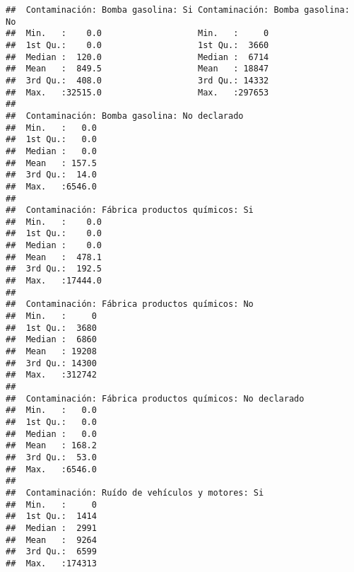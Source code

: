 \documentclass[11pt,]{article}
\begin{document}
\begin{verbatim}
##  Contaminación: Bomba gasolina: Si Contaminación: Bomba gasolina: No
##  Min.   :    0.0                   Min.   :     0                   
##  1st Qu.:    0.0                   1st Qu.:  3660                   
##  Median :  120.0                   Median :  6714                   
##  Mean   :  849.5                   Mean   : 18847                   
##  3rd Qu.:  408.0                   3rd Qu.: 14332                   
##  Max.   :32515.0                   Max.   :297653                   
##                                                                     
##  Contaminación: Bomba gasolina: No declarado
##  Min.   :   0.0                             
##  1st Qu.:   0.0                             
##  Median :   0.0                             
##  Mean   : 157.5                             
##  3rd Qu.:  14.0                             
##  Max.   :6546.0                             
##                                             
##  Contaminación: Fábrica productos químicos: Si
##  Min.   :    0.0                              
##  1st Qu.:    0.0                              
##  Median :    0.0                              
##  Mean   :  478.1                              
##  3rd Qu.:  192.5                              
##  Max.   :17444.0                              
##                                               
##  Contaminación: Fábrica productos químicos: No
##  Min.   :     0                               
##  1st Qu.:  3680                               
##  Median :  6860                               
##  Mean   : 19208                               
##  3rd Qu.: 14300                               
##  Max.   :312742                               
##                                               
##  Contaminación: Fábrica productos químicos: No declarado
##  Min.   :   0.0                                         
##  1st Qu.:   0.0                                         
##  Median :   0.0                                         
##  Mean   : 168.2                                         
##  3rd Qu.:  53.0                                         
##  Max.   :6546.0                                         
##                                                         
##  Contaminación: Ruído de vehículos y motores: Si
##  Min.   :     0                                 
##  1st Qu.:  1414                                 
##  Median :  2991                                 
##  Mean   :  9264                                 
##  3rd Qu.:  6599                                 
##  Max.   :174313                                 

\end{verbatim}
\end{document}
